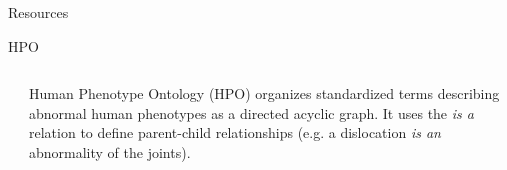 \documentclass[final]{beamer} %
\begin{document}
\begin{frame}{}
\begin{columns}[T]
\begin{column}{0.3\linewidth}
\begin{block}{\Huge Resources}
    \begin{block}{\Large HPO}
   \begin{columns}[T]
      \begin{column}{.5\textwidth}
      \centering
     \end{column}
     \begin{column}{.5\textwidth}
      \Large
      Human Phenotype Ontology (HPO) organizes standardized terms describing abnormal human phenotypes as a directed acyclic graph. It uses the  {\it{\Large is a}} relation to define parent-child relationships (e.g. a dislocation {\it{\Large is an}} abnormality of the joints).
     \end{column}
   \end{columns}
  \end{block}   


\end{block}
\end{column}
\end{columns}
\end{frame}
\end{document}
